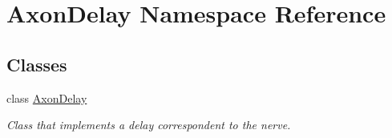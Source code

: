 \hypertarget{namespace_axon_delay}{\section{Axon\-Delay Namespace Reference}
\label{namespace_axon_delay}
}
\subsection*{Classes}
\begin{DoxyCompactItemize}
\item 
class \hyperlink{class_axon_delay_1_1_axon_delay}{Axon\-Delay}
\begin{DoxyCompactList}\small\item\em Class that implements a delay correspondent to the nerve. \end{DoxyCompactList}\end{DoxyCompactItemize}

